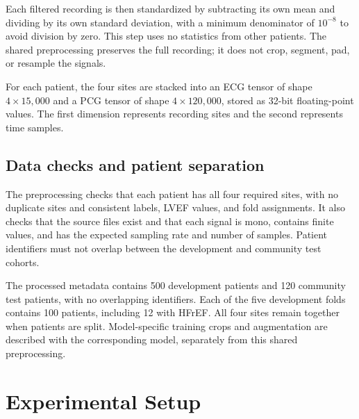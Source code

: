 \documentclass[11pt,a4paper]{article}
\newcommand{\draftnote}[1]{\par\smallskip\noindent\textcolor{blue}{\textbf{To write:} #1}\par\smallskip}
\begin{document}
Each filtered recording is then standardized by subtracting its own mean
and dividing by its own standard deviation, with a minimum denominator of
$10^{-8}$ to avoid division by zero. This step uses no statistics from
other patients. The shared preprocessing preserves the full recording;
it does not crop, segment, pad, or resample the signals.

For each patient, the four sites are stacked into an ECG tensor of shape
$4\times15{,}000$ and a PCG tensor of shape $4\times120{,}000$, stored as
32-bit floating-point values. The first dimension represents recording
sites and the second represents time samples.

\subsection{Data checks and patient separation}
The preprocessing checks that each patient has all four required sites,
with no duplicate sites and consistent labels, LVEF values, and fold
assignments. It also checks that the source files exist and that each
signal is mono, contains finite values, and has the expected sampling
rate and number of samples. Patient identifiers must not overlap between
the development and community test cohorts.

The processed metadata contains 500 development patients and 120 community
test patients, with no overlapping identifiers. Each of the five development
folds contains 100 patients, including 12 with HFrEF. All four sites remain
together when patients are split. Model-specific training crops and
augmentation are described with the corresponding model, separately from
this shared preprocessing.

\section{Experimental Setup}
\label{sec:evaluation}
\end{document}
